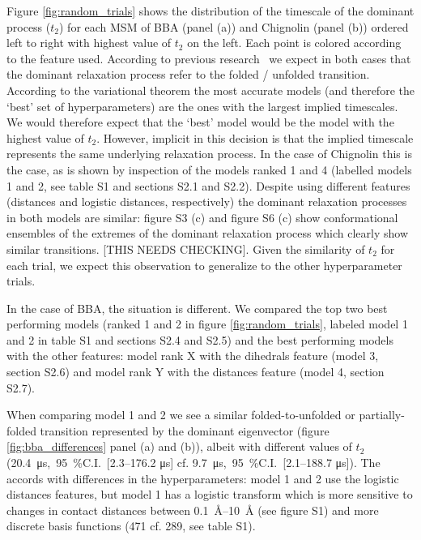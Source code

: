 \documentclass[journal=jacsat,manuscript=article]{achemso}
\newcommand{\SIci}[4]{\SI{#1}{#4},\ \SI{95}{\percent}C.I.\ [\numrange[range-phrase=---]{#2}{#3} \si{#4}]}
\begin{document}
Figure \ref{fig:random_trials} shows the distribution of the timescale of the dominant process ($t_2$) for each MSM of BBA (panel (a)) and Chignolin (panel (b)) ordered left to right with highest value of $t_2$ on the left. Each point is colored according to the feature used. According to previous research~\cite{scherer_variational_2019} we expect in both cases that the dominant relaxation process refer to the folded / unfolded transition.  According to the variational theorem the most accurate models (and therefore the `best' set of hyperparameters) are the ones with the largest implied timescales. We would therefore expect that the `best' model would be the model with the highest value of $t_2$. However, implicit in this decision is that the implied timescale represents the same underlying relaxation process. In the case of Chignolin this is the case, as is shown by inspection of the models ranked 1 and 4 (labelled models 1 and 2, see table S1 and sections S2.1 and S2.2).  Despite using different features (distances and logistic distances, respectively) the dominant relaxation processes in both models are similar: figure S3 (c) and figure S6 (c) show conformational ensembles of the extremes of the dominant relaxation process which clearly show similar transitions.  [THIS NEEDS CHECKING].  Given the similarity of $t_2$ for each trial, we expect this observation to generalize to the other hyperparameter trials. 

In the case of BBA, the situation is different. We compared the top two best performing models (ranked 1 and 2 in figure \ref{fig:random_trials}, labeled model 1 and 2 in table S1 and sections S2.4 and S2.5) and the best performing models with the other features: model rank X with the dihedrals feature (model 3, section S2.6) and model rank Y with the distances feature (model 4, section S2.7). 

When comparing model 1 and 2 we see a similar folded-to-unfolded or partially-folded transition represented by the dominant eigenvector (figure \ref{fig:bba_differences} panel (a) and (b)), albeit with different values of $t_2$ (\SIci{20.4}{2.3}{176.2}{\micro\second} cf. \SIci{9.7}{2.1}{188.7}{\micro\second}). The accords with differences in the hyperparameters: model 1 and 2 use the logistic distances features, but model 1 has a logistic transform which is more sensitive to changes in contact distances between \SIrange[range-phrase=---]{0.1}{10}{\angstrom} (see figure S1) and more discrete basis functions (471 cf. 289, see table S1).  
\end{document}
